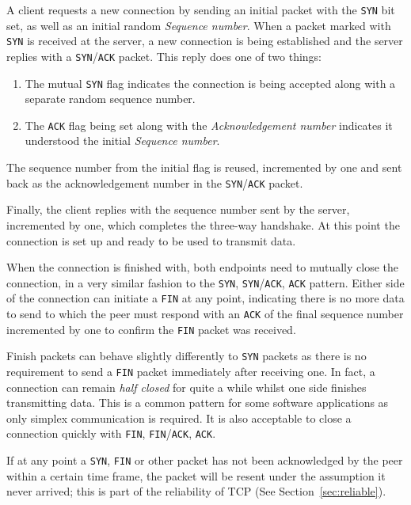 \documentclass[11pt,a4paper,british]{bhamarticle}
\begin{document}
\begin{multicols}{2}
A client requests a new connection by sending an initial packet with the \texttt{SYN} bit set, as well as an initial random \textit{Sequence number}. When a packet marked with \texttt{SYN} is received at the server, a new connection is being established and the server replies with a \texttt{SYN}/\texttt{ACK} packet. This reply does one of two things:
\begin{enumerate}
    \item The mutual \texttt{SYN} flag indicates the connection is being accepted along with a separate random sequence number.
    \item The \texttt{ACK} flag being set along with the \textit{Acknowledgement number} indicates it understood the initial \textit{Sequence number}.
\end{enumerate}
The sequence number from the initial flag is reused, incremented by one and sent back as the acknowledgement number in the \texttt{SYN}/\texttt{ACK} packet.

Finally, the client replies with the sequence number sent by the server, incremented by one, which completes the three-way handshake. At this point the connection is set up and ready to be used to transmit data.

When the connection is finished with, both endpoints need to mutually close the connection, in a very similar fashion to the \texttt{SYN}, \texttt{SYN}/\texttt{ACK}, \texttt{ACK} pattern.
Either side of the connection can initiate a \texttt{FIN} at any point, indicating there is no more data to send to which the peer must respond with an \texttt{ACK} of the final sequence number incremented by one to confirm the \texttt{FIN} packet was received.

Finish packets can behave slightly differently to \texttt{SYN} packets as there is no requirement to send a \texttt{FIN} packet immediately after receiving one. In fact, a connection can remain \textit{half closed} for quite a while whilst one side finishes transmitting data. This is a common pattern for some software applications as only simplex communication is required. It is also acceptable to close a connection quickly with \texttt{FIN}, \texttt{FIN}/\texttt{ACK}, \texttt{ACK}.

If at any point a \texttt{SYN}, \texttt{FIN} or other packet has not been acknowledged by the peer within a certain time frame, the packet will be resent under the assumption it never arrived; this is part of the reliability of TCP (See Section~\ref{sec:reliable}).


\end{multicols}
\end{document}
